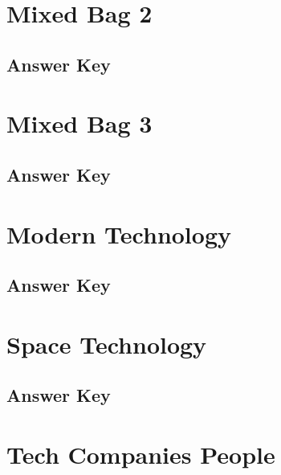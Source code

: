 \documentclass[12pt,a4paper]{book}
\begin{document}


\section{Mixed Bag 2}



\subsection*{Answer Key}



\section{Mixed Bag 3}



\subsection*{Answer Key}



\section{Modern Technology}



\subsection*{Answer Key}



\section{Space Technology}



\subsection*{Answer Key}



\section{Tech Companies People}
\end{document}
